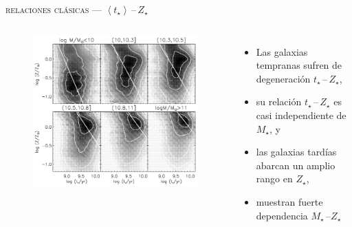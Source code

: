 \documentclass[xcolor=dvipsnames,4pt,fleqn,hyperref={colorlinks,citecolor=black,linkcolor=black,urlcolor=black}]{beamer}
\begin{document}
\begin{frame}{\textsc{relaciones clásicas --- $\left<t_\star\right>\,$--$\,Z_\star$}}
\begin{columns}
{\begin{figure}
\includegraphics[scale=0.45]{img/gallazzi2005-11}
\end{figure}

\begin{itemize}
\setlength\itemsep{0.5em}
\item Las galaxias tempranas sufren de degeneración $t_\star\,$--$\,Z_\star$,
\item su relación $t_\star\,$--$\,Z_\star$ es casi independiente de $M_\star$, y
\item las galaxias tardías abarcan un amplio rango en $Z_\star$,
\item muestran fuerte dependencia $M_\star\,$--$Z_\star$
\end{itemize}
}
\end{columns}
\end{frame}
\end{document}
